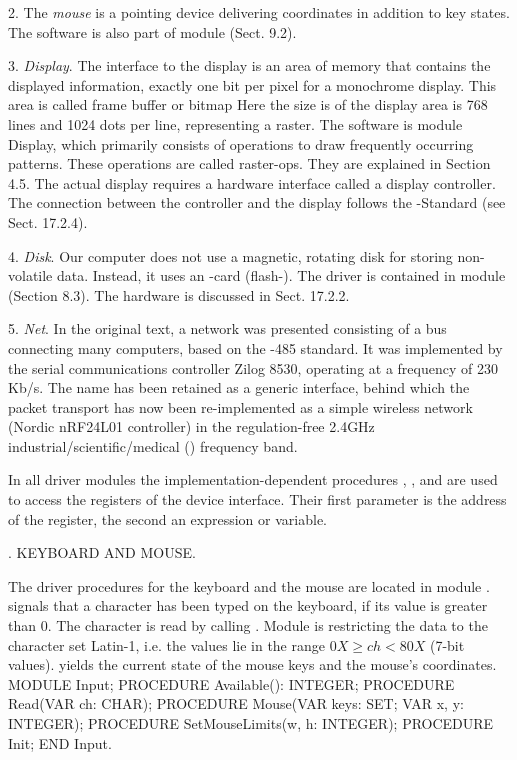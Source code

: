 2. The \emph{mouse} is a pointing device delivering coordinates in addition to key states. The software is also part of module  (Sect. 9.2).

3. \emph{Display}. The interface to the display is an area of memory that contains the displayed information, exactly one bit per pixel for a monochrome display. This area is called frame buffer or bitmap Here the size is of the display area is 768 lines and 1024 dots per line, representing a raster. The software is module Display, which primarily consists of operations to draw frequently occurring patterns. These operations are called raster-ops. They are explained in Section 4.5. The actual display requires a hardware interface called a display controller. The connection between the controller and the display follows the -Standard (see Sect. 17.2.4).

4. \emph{Disk}. Our \RISC computer does not use a magnetic, rotating disk for storing non-volatile data. Instead, it uses an -card (flash-). The driver is contained in module  (Section 8.3). The hardware is discussed in Sect. 17.2.2.

5. \emph{Net}. In the original text, a network was presented consisting of a bus connecting many computers, based on the -485 standard. It was implemented by the serial communications controller Zilog 8530, operating at a frequency of 230 Kb/s. The name  has been retained as a generic interface, behind which the packet transport has now been re-implemented as a simple wireless network (Nordic nRF24L01 controller) in the regulation-free 2.4GHz industrial/scientific/medical () frequency band.

In all driver modules the implementation-dependent procedures , , and  are used to access the registers of the device interface. Their first parameter is the address of the register, the second an expression or variable.

. KEYBOARD AND MOUSE.

The driver procedures for the keyboard and the mouse are located in module .  signals that a character has been typed on the keyboard, if its value is greater than 0. The character is read by calling . Module  is restricting the data to the \ASCII character set Latin-1, i.e. the values lie in the range $0X \ge ch < 80X$ (7-bit values).  yields the current state of the mouse keys and the mouse's coordinates.
\begintt
MODULE Input;
PROCEDURE Available(): INTEGER;
PROCEDURE Read(VAR ch: CHAR);
PROCEDURE Mouse(VAR keys: SET; VAR x, y: INTEGER);
PROCEDURE SetMouseLimits(w, h: INTEGER);
PROCEDURE Init;
END Input.
\endtt

